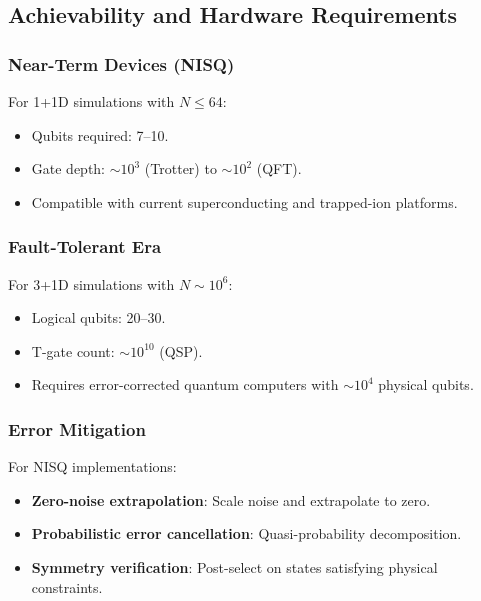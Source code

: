 \documentclass[11pt,a4paper]{article}
\theoremstyle{plain}
\theoremstyle{definition}
\theoremstyle{remark}
\begin{document}
\subsection{Achievability and Hardware Requirements}\label{subsec:achievability}

\subsubsection{Near-Term Devices (NISQ)}

For 1+1D simulations with $N \leq 64$:
\begin{itemize}
    \item Qubits required: 7--10.
    \item Gate depth: $\sim 10^3$ (Trotter) to $\sim 10^2$ (QFT).
    \item Compatible with current superconducting and trapped-ion platforms.
\end{itemize}

\subsubsection{Fault-Tolerant Era}

For 3+1D simulations with $N \sim 10^6$:
\begin{itemize}
    \item Logical qubits: 20--30.
    \item T-gate count: $\sim 10^{10}$ (QSP).
    \item Requires error-corrected quantum computers with $\sim 10^4$ physical qubits.
\end{itemize}

\subsubsection{Error Mitigation}

For NISQ implementations:
\begin{itemize}
    \item \textbf{Zero-noise extrapolation}: Scale noise and extrapolate to zero.
    \item \textbf{Probabilistic error cancellation}: Quasi-probability decomposition.
    \item \textbf{Symmetry verification}: Post-select on states satisfying physical constraints.
\end{itemize}

\end{document}
